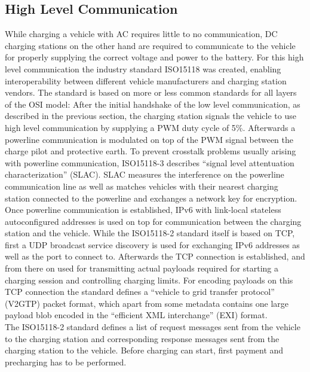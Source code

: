 \documentclass[conference,flushend]{iaria} %
\begin{document}
\subsection{High Level Communication} \label{sec:highlevelcomm}
While charging a vehicle with AC requires little to no communication,
DC charging stations on the other hand are required to communicate to the vehicle for properly supplying the correct voltage and power to the battery.
For this high level communication the industry standard ISO15118 \cite{isoiec_isoiec_2012} was created, enabling interoperability between different vehicle manufacturers and charging station vendors.
The standard is based on more or less common standards for all layers of the OSI model:
After the initial handshake of the low level communication, as described in the previous section, the charging station signals the vehicle to use high level communication by supplying a PWM duty cycle of 5\%.
Afterwards a powerline communication is modulated on top of the PWM signal between the charge pilot and protective earth.
To prevent crosstalk problems \cite{li_crosstalk_2019, theethayi_parameters_2003, ngo_bisse_crosstalk_2023} usually arising with powerline communication, ISO15118-3 \cite{isoiec_isoiec_2012-1} describes \enquote{signal level attentuation characterization} (SLAC).
SLAC measures the interference on the powerline communication line as well as matches vehicles with their nearest charging station connected to the powerline and exchanges a network key for encryption.
Once powerline communication is established, IPv6 with link-local stateless autoconfigured addresses is used on top for communication between the charging station and the vehicle.
While the ISO15118-2 standard \cite{isoiec_isoiec_2012} itself is based on TCP, first a UDP broadcast service discovery is used for exchanging IPv6 addresses as well as the port to connect to.
Afterwards the TCP connection is established, and from there on used for transmitting actual payloads required for starting a charging session and controlling charging limits.
For encoding payloads on this TCP connection the standard defines a \enquote{vehicle to grid transfer protocol} (V2GTP) packet format, which apart from some metadata contains one large payload blob encoded in the \enquote{efficient XML interchange} (EXI) format. \\
The ISO15118-2 standard defines a list of request messages sent from the vehicle to the charging station and corresponding response messages sent from the charging station to the vehicle.
Before charging can start, first payment and precharging has to be performed.
\end{document}

